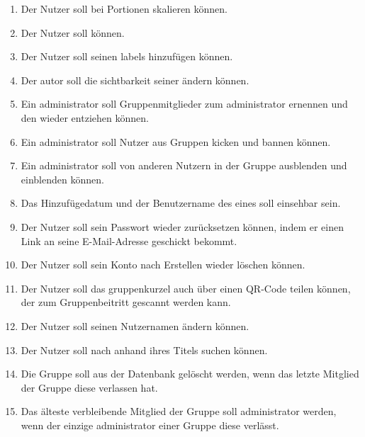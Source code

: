 \documentclass[parskip=full]{scrartcl}
\begin{document}
\begin{enumerate}[start=1,label={$\langle$\bfseries RS\arabic*$\rangle$}, leftmargin = 5em, itemsep=4pt, parsep=4pt]
    \item Der Nutzer soll bei  Portionen skalieren können.\label{rs:PortionScaling}
    \item Der Nutzer soll   können.\label{rs:RecipeFavourites}
    \item Der Nutzer soll seinen  \gls{labels} hinzufügen können.\label{rs:RecipeLabels}
    \item Der \gls{autor} soll die \gls{sichtbarkeit} seiner  ändern können.\label{rs:RecipeVisibility}
    \item Ein \gls{administrator} soll Gruppenmitglieder zum \gls{administrator} ernennen und den  wieder entziehen können.\label{rs:AdminCreation}
    \item Ein \gls{administrator} soll Nutzer aus Gruppen \gls{kicken} und \gls{bannen} können.\label{rs:Kicking}
    \item Ein \gls{administrator} soll  von anderen Nutzern in der Gruppe \gls{ausblenden} und \gls{einblenden} können.\label{rs:RecipeHiding}
    \item Das Hinzufügedatum und der Benutzername des  eines  soll einsehbar sein.\label{rs:AuthorAndDate}
    \item Der Nutzer soll sein Passwort wieder zurücksetzen können, indem er einen Link an seine E-Mail-Adresse geschickt bekommt.\label{rs:ResetPassword}
    \item Der Nutzer soll sein Konto nach Erstellen wieder löschen können.\label{rs:AccountDeletion}
    \item Der Nutzer soll das \gls{gruppenkurzel} auch über einen QR-Code teilen können, der zum Gruppenbeitritt gescannt werden kann.\label{rs:QRCode}
    \item Der Nutzer soll seinen Nutzernamen ändern können.\label{rs:ChangeUsername}
    \item Der Nutzer soll nach  anhand ihres Titels suchen können.\label{rs:Searching}
    \item Die Gruppe soll aus der Datenbank gelöscht werden, wenn das letzte Mitglied der Gruppe diese verlassen hat.\label{rs:EmptyGroup}
    \item Das älteste verbleibende Mitglied der Gruppe soll \gls{administrator} werden, wenn der einzige \gls{administrator} einer Gruppe diese verlässt.\label{rs:NoAdmins}

\end{enumerate}
\end{document}
